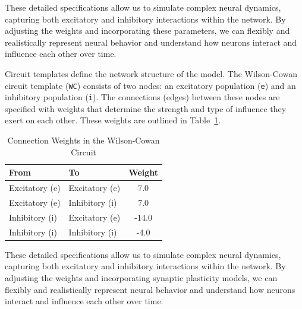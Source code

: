 \documentclass[12pt]{article}
\begin{document}
These detailed specifications allow us to simulate complex neural dynamics, capturing both excitatory and inhibitory interactions within the network. By adjusting the weights and incorporating these parameters, we can flexibly and realistically represent neural behavior and understand how neurons interact and influence each other over time.


Circuit templates define the network structure of the model. The Wilson-Cowan circuit template (\texttt{WC}) consists of two nodes: an excitatory population (\texttt{e}) and an inhibitory population (\texttt{i}). The connections (edges) between these nodes are specified with weights that determine the strength and type of influence they exert on each other. These weights are outlined in Table~\ref{tab:weights}.

\begin{table}[h]
    \centering
    \caption{Connection Weights in the Wilson-Cowan Circuit}
    \label{tab:weights}
    \begin{tabular}{@{}llc@{}}
        \toprule
        \textbf{From} & \textbf{To} & \textbf{Weight} \\ \midrule
        Excitatory (e) & Excitatory (e) & 7.0 \\
        Excitatory (e) & Inhibitory (i) & 7.0 \\
        Inhibitory (i) & Excitatory (e) & -14.0 \\
        Inhibitory (i) & Inhibitory (i) & -4.0 \\ \bottomrule
    \end{tabular}
\end{table}

These detailed specifications allow us to simulate complex neural dynamics, capturing both excitatory and inhibitory interactions within the network. By adjusting the weights and incorporating synaptic plasticity models, we can flexibly and realistically represent neural behavior and understand how neurons interact and influence each other over time.
\end{document}
